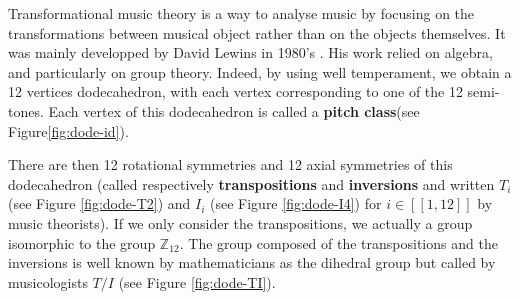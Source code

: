 Transformational music theory is a way to analyse music by focusing on the transformations between musical object rather than on the objects themselves. It was mainly developped by David Lewins in 1980's \cite{rahn_lewin_1987}. His work relied on algebra, and particularly on group theory. Indeed, by using well temperament, we obtain a 12 vertices dodecahedron, with each vertex corresponding to one of the 12 semi-tones. Each vertex of this dodecahedron is called a \textbf{pitch class}(see Figure\ref{fig:dode-id}).

There are then 12 rotational symmetries and 12 axial symmetries of this dodecahedron (called  respectively \textbf{transpositions} and \textbf{inversions} and written $T_i$\label{nomencl:Ti} (see Figure \ref{fig:dode-T2}) and $I_i$\label{nomencl:Ii} (see Figure \ref{fig:dode-I4}) for $i\in [\![1,12]\!]$ by music theorists). If we only consider the transpositions, we actually a group isomorphic to the group $\mathbb{Z}_{12}$\label{nomencl:Zn}. The group  composed of the transpositions and the inversions is well known by mathematicians as the dihedral group but called by musicologists
$T/I$ \label{nomencl:TI} (see Figure \ref{fig:dode-TI}).

